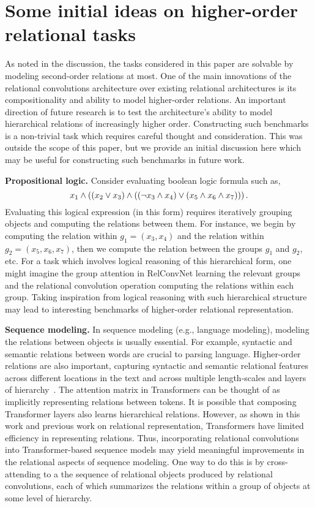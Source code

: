 \section{Some initial ideas on higher-order relational tasks}

As noted in the discussion, the tasks considered in this paper are solvable by modeling second-order relations at most. One of the main innovations of the relational convolutions architecture over existing relational architectures is its compositionality and ability to model higher-order relations. An important direction of future research is to test the architecture's ability to model hierarchical relations of increasingly higher order. Constructing such benchmarks is a non-trivial task which requires careful thought and consideration. This was outside the scope of this paper, but we provide an initial discussion here which may be useful for constructing such benchmarks in future work.

\textbf{Propositional logic.} Consider evaluating boolean logic formula such as, 
\begin{equation*}
    x_1 \land \left((x_2 \lor x_3) \land \left((\lnot x_3 \land x_4) \lor (x_5 \land x_6 \land x_7)\right)\right).
\end{equation*}
Evaluating this logical expression (in this form) requires iteratively grouping objects and computing the relations between them. For instance, we begin by computing the relation within $g_1 = (x_3, x_4)$ and the relation within $g_2 = (x_5, x_6, x_7)$, then we compute the relation between the groups $g_1$ and $g_2$, etc. For a task which involves logical reasoning of this hierarchical form, one might imagine the group attention in RelConvNet learning the relevant groups and the relational convolution operation computing the relations within each group. Taking inspiration from logical reasoning with such hierarchical structure may lead to interesting benchmarks of higher-order relational representation.

\textbf{Sequence modeling.} In sequence modeling (e.g., language modeling), modeling the relations between objects is usually essential. For example, syntactic and semantic relations between words are crucial to parsing language. Higher-order relations are also important, capturing syntactic and semantic relational features across different locations in the text and across multiple length-scales and layers of hierarchy~\citep[see for example some relevant work in linguistics][]{frank2012hierarchical,rosario2002descent}. The attention matrix in Transformers can be thought of as implicitly representing relations between tokens. It is possible that composing Transformer layers also learns hierarchical relations. However, as shown in this work and previous work on relational representation, Transformers have limited efficiency in representing relations. Thus, incorporating relational convolutions into Transformer-based sequence models may yield meaningful improvements in the relational aspects of sequence modeling. One way to do this is by cross-attending to a the sequence of relational objects produced by relational convolutions, each of which summarizes the relations within a group of objects at some level of hierarchy.

